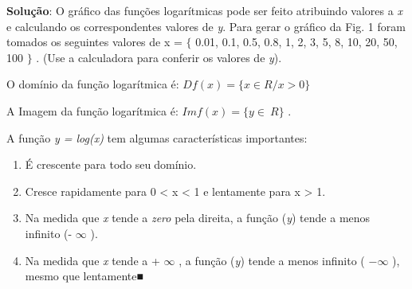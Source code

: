 \documentclass[12pt]{article}
\begin{document}
\vspace{\baselineskip}
\begin{adjustwidth}{0.75in}{0.0in}
\textbf{Solução}: O gráfico das funções logarítmicas pode ser feito atribuindo valores a \textit{x} e calculando os correspondentes valores de \textit{y}. Para gerar o gráfico da Fig. 1 foram tomados os seguintes valores de x = $ \{ $ 0.01, 0.1, 0.5, 0.8, 1, 2, 3, 5, 8, 10, 20, 50, 100 $ \} $ . (Use a calculadora para conferir os valores de \textit{y}).\par

\end{adjustwidth}


\vspace{\baselineskip}
\begin{adjustwidth}{0.75in}{0.0in}
O domínio da função logarítmica é:  \( Df \left( x \right) = \{ x \in  R / x>0  \}  \) \par

\end{adjustwidth}

\begin{adjustwidth}{0.75in}{0.0in}
A Imagem da função logarítmica é:  \( Imf \left( x \right) = \{ y \in ~R   \}  \) .\par

\end{adjustwidth}


\vspace{\baselineskip}
\begin{adjustwidth}{0.75in}{0.0in}
A função \textit{y = log(x)} tem algumas características importantes:\par

\end{adjustwidth}

\begin{enumerate}
	\item É crescente para todo seudomínio. \par

	\item Cresce rapidamente para 0 < x < 1 e lentamente para x > 1. \par

	\item Na medida que \textit{x} tende a \textit{zero} pela direita, a função (\textit{y}) tende a menos infinito (-  \( \infty \) ).\par

	\item Na medida que \textit{x} tende a +  \( \infty \) , a função (\textit{y}) tende a menos infinito (  \( -\infty \) ), mesmo que lentamente■
\end{enumerate}\par
\end{document}

